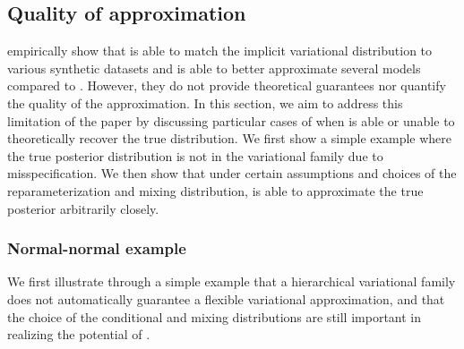 \documentclass[10pt]{article}
\begin{document}
\subsection{Quality of approximation} \label{sec:approximation}

\citet{Titsias:2019} empirically show that \uivi is able to match the implicit variational distribution to various synthetic datasets and is able to better approximate several models compared to \sivi. However, they do not provide theoretical guarantees nor quantify the quality of the \uivi approximation. In this section, we aim to address this limitation of the paper by discussing particular cases of when \uivi is able or unable to theoretically recover the true distribution. We first show a simple example where the true posterior distribution is not in the variational family due to misspecification. We then show that under certain assumptions and choices of the reparameterization and mixing distribution, \uivi is able to approximate the true posterior arbitrarily closely.

\subsubsection{Normal-normal example}

We first illustrate through a simple example that a hierarchical variational family does not automatically guarantee a flexible variational approximation, and that the choice of the conditional and mixing distributions are still important in realizing the potential of \uivi.
\\
\end{document}
